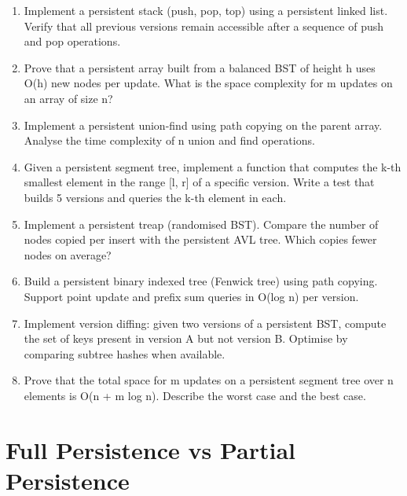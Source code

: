 \begin{enumerate}
\item Implement a persistent stack (push, pop, top) using a persistent linked list. Verify that all previous versions remain accessible after a sequence of push and pop operations.

\item Prove that a persistent array built from a balanced BST of height h uses O(h) new nodes per update. What is the space complexity for m updates on an array of size n?

\item Implement a persistent union-find using path copying on the parent array. Analyse the time complexity of n union and find operations.

\item Given a persistent segment tree, implement a function that computes the k-th smallest element in the range [l, r] of a specific version. Write a test that builds 5 versions and queries the k-th element in each.

\item Implement a persistent treap (randomised BST). Compare the number of nodes copied per insert with the persistent AVL tree. Which copies fewer nodes on average?

\item Build a persistent binary indexed tree (Fenwick tree) using path copying. Support point update and prefix sum queries in O(log n) per version.

\item Implement version diffing: given two versions of a persistent BST, compute the set of keys present in version A but not version B. Optimise by comparing subtree hashes when available.

\item Prove that the total space for m updates on a persistent segment tree over n elements is O(n + m log n). Describe the worst case and the best case.
\end{enumerate}


\section{Full Persistence vs Partial Persistence}
\label{sec21:full-vs-partial}

